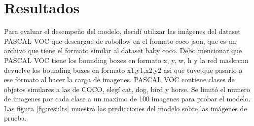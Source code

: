 \documentclass{article}
\begin{document}
\section{Resultados}
Para evaluar el desempeño del modelo, decidí  utilizar las imágenes del dataset PASCAL VOC que descargue de roboflow \cite{pascal_voc_2012} en el formato coco json, que es un archivo que tiene el formato similar al dataset baby coco.
Debo mencionar que PASCAL VOC tiene los bounding boxes en formato x, y, w, h y la red maskrcnn devuelve los bounding boxes en formato x1,y1,x2,y2 asi que tuve que pasarlo a ese formato al hacer la carga de imagenes. PASCAL VOC 
contiene clases de objetos similares a las de COCO, elegí cat, dog, bird y horse. 
Se limitó el numero de imagenes por cada clase a un maximo de 100 imagenes para probar el modelo.
Las figura \ref{fig:results} muestra las predicciones del modelo sobre las imágenes de prueba.
\end{document}
